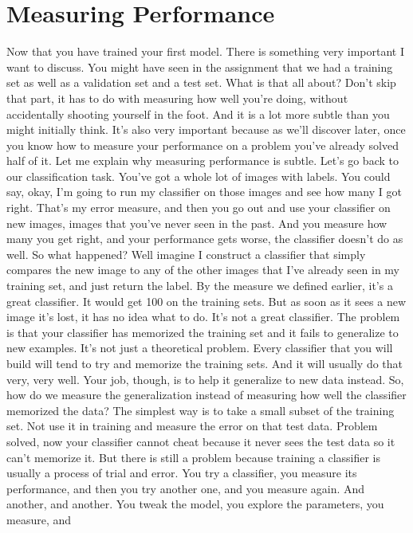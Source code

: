 \documentclass{article}
\begin{document}
\section{Measuring Performance}
Now that you have trained
your first model.
There is something very
important I want to discuss.
You might have seen in the assignment
that we had a training set
as well as a validation set and
a test set.
What is that all about?
Don't skip that part, it has to do
with measuring how well you're doing,
without accidentally shooting
yourself in the foot.
And it is a lot more subtle
than you might initially think.
It's also very important because as
we'll discover later, once you know how
to measure your performance on a problem
you've already solved half of it.
Let me explain why measuring
performance is subtle.
Let's go back to our
classification task.
You've got a whole lot
of images with labels.
You could say, okay, I'm going to run
my classifier on those images and
see how many I got right.
That's my error measure, and then you
go out and use your classifier on new
images, images that you've
never seen in the past.
And you measure how many you get right,
and
your performance gets worse,
the classifier doesn't do as well.
So what happened?
Well imagine I construct a classifier
that simply compares the new image to
any of the other images that I've
already seen in my training set, and
just return the label.
By the measure we defined earlier,
it's a great classifier.
It would get 100%
on the training sets.
But as soon as it sees a new image
it's lost, it has no idea what to do.
It's not a great classifier.
The problem is that your classifier
has memorized the training set and
it fails to generalize to new examples.
It's not just a theoretical problem.
Every classifier that you will
build will tend to try and
memorize the training sets.
And it will usually do that very,
very well.
Your job, though, is to help it
generalize to new data instead.
So, how do we measure
the generalization instead of measuring
how well the classifier
memorized the data?
The simplest way is to take a small
subset of the training set.
Not use it in training and
measure the error on that test data.
Problem solved,
now your classifier cannot cheat
because it never sees the test data so
it can't memorize it.
But there is still a problem because
training a classifier is usually
a process of trial and error.
You try a classifier,
you measure its performance, and
then you try another one,
and you measure again.
And another, and another.
You tweak the model, you explore
the parameters, you measure, and
\end{document}

